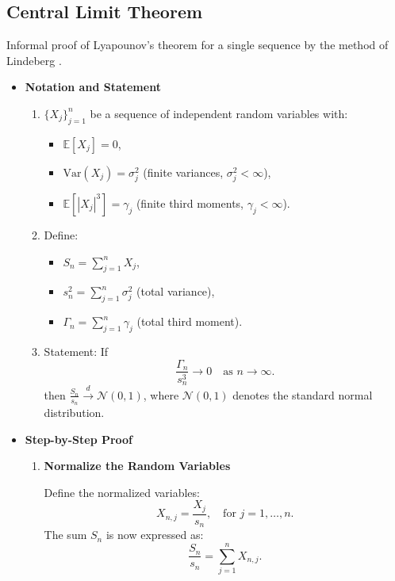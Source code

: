 \subsection{Central Limit Theorem}
Informal proof of Lyapounov's theorem for a single sequence by the method of Lindeberg \cite{chung2000course}.
\begin{itemize}
    \item \textbf{Notation and Statement}
    \begin{enumerate}
    \item \( \{X_j\}_{j=1}^n \) be a sequence of independent random variables with:
    \begin{itemize}
        \item[] \( \mathbb{E}[X_j] = 0 \), 
        \item[] \( \text{Var}(X_j) = \sigma_j^2 \) (finite variances, \( \sigma_j^2 < \infty \)),
        \item[] \( \mathbb{E}[|X_j|^3] = \gamma_j \) (finite third moments, \( \gamma_j < \infty \)).
    \end{itemize}

        \item Define:
        \begin{itemize}
            \item[] \( S_n = \sum_{j=1}^n X_j \),
            \item[] \( s_n^2 = \sum_{j=1}^n \sigma_j^2 \) (total variance),
            \item[] \( \Gamma_n = \sum_{j=1}^n \gamma_j \) (total third moment).
        \end{itemize}

        \item Statement:
    If 
    \[
   \frac{\Gamma_n}{s_n^3} \to 0 \quad \text{as } n \to \infty.
   \]
   then \( \frac{S_n}{s_n} \xrightarrow{d} \mathcal{N}(0,1) \),
   where \( \mathcal{N}(0,1) \) denotes the standard normal distribution.
   
    \end{enumerate}
    \item \textbf{Step-by-Step Proof}
    \begin{enumerate}
        \item \textbf{Normalize the Random Variables}
        
        Define the normalized variables:
\[
X_{n,j} = \frac{X_j}{s_n}, \quad \text{for } j = 1, \dots, n.
\]
The sum \( S_n \) is now expressed as:
\[
\frac{S_n}{s_n} = \sum_{j=1}^n X_{n,j}.
\]


\end{enumerate}
\end{itemize}
